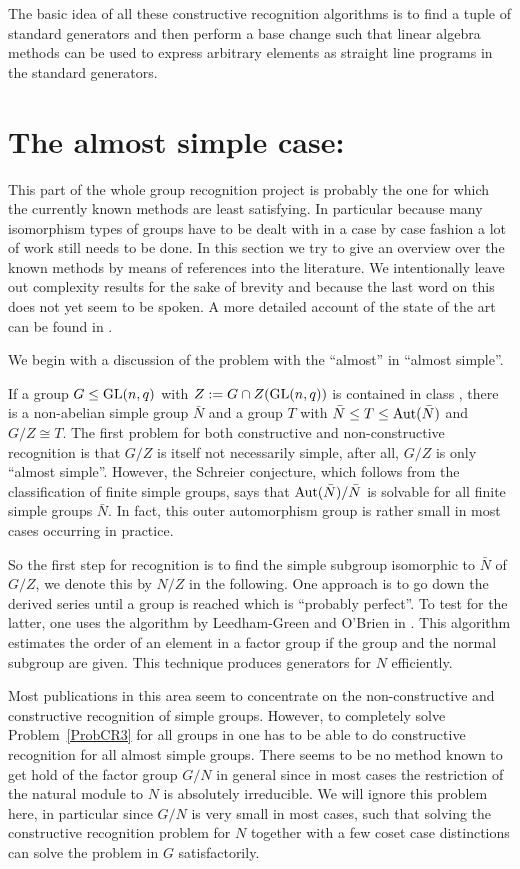 The basic idea of all these constructive recognition algorithms is to find
a tuple of standard generators and then perform a base change
such that linear algebra methods can be used to express arbitrary
elements as straight line programs in the standard generators.


\section{The almost simple case: }
\label{solveD9}

This part of the whole group recognition project is probably the one
for which the currently known methods are least satisfying. In particular
because many isomorphism types of groups have to be dealt with in a case by
case fashion a lot of work still needs to be done.
In this section we try to give an overview over the known methods by
means of references into the literature. We intentionally leave out
complexity results for the sake of brevity and because the last word on
this does not yet seem to be spoken. A more detailed account of
the state of the art can be found in \cite{towards}.

We begin with a discussion of the problem with the ``almost'' in
``almost simple''.

If a group $G \le \GL(n,q)$ with $Z := G \cap Z(\GL(n,q))$ 
is contained in class , there is a
non-abelian simple group $\bar N$ and a group $T$ with $\bar N
\leq T \leq \Aut(\bar N)$ and $G/Z \cong T$. The first problem for
both constructive and non-constructive recognition is that $G/Z$ is
itself not necessarily simple, after all, $G/Z$ is only ``almost simple''.
However, the Schreier conjecture, which follows from the classification
of finite simple groups, says that $\Aut(\bar N) / \bar N$ is solvable
for all finite simple groups $\bar N$. In fact, this outer automorphism
group is rather small in most cases occurring in practice.

So the first step for recognition is to find the simple subgroup
isomorphic to $\bar N$ of $G/Z$, we denote this by $N/Z$ in the following. 
One approach is to go down the derived series
until a group is reached which is ``probably perfect''. To test for
the latter, one uses the algorithm by Leedham-Green and O'Brien in
\cite[5.3]{RecogTensInd}. This algorithm estimates the order of an element in a
factor group if the group and the normal subgroup are given.
This technique produces generators for $N$ efficiently.

Most publications in this area seem to concentrate on the
non-constructive and constructive recognition of simple groups.
However, to completely solve Problem~\ref{ProbCR3} for all groups in
 one has to be able to do constructive recognition for all
almost simple groups. There seems to be no method known to get hold of
the factor group $G/N$ in general since in most cases
the restriction of the natural module to $N$ is absolutely
irreducible.  We will ignore this problem here, in particular since $G/N$
is very small in most cases, such that solving the constructive recognition
problem for $N$ together with a few coset case distinctions can solve the
problem in $G$ satisfactorily.

